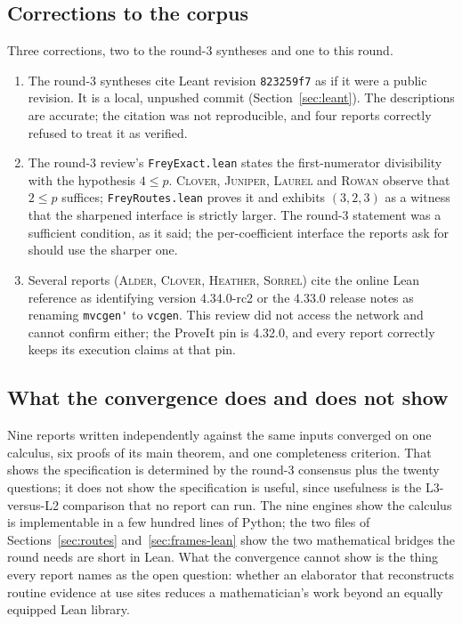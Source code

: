 \documentclass[11pt,a4paper]{article}
\newcommand{\code}[1]{\nolinkurl{#1}}
\newcommand{\Al}{\textsc{Alder}}
\newcommand{\Cl}{\textsc{Clover}}
\newcommand{\He}{\textsc{Heather}}
\newcommand{\Ju}{\textsc{Juniper}}
\newcommand{\La}{\textsc{Laurel}}
\newcommand{\Ro}{\textsc{Rowan}}
\newcommand{\So}{\textsc{Sorrel}}
\theoremstyle{definition}
\theoremstyle{plain}
\begin{document}
\subsection{Corrections to the corpus}\label{sec:corpus-correction}
Three corrections, two to the round-3 syntheses and one to this round.
\begin{enumerate}
\item The round-3 syntheses cite Leant revision \code{823259f7} as if it were a public revision. It is a local, unpushed commit (Section~\ref{sec:leant}). The descriptions are accurate; the citation was not reproducible, and four reports correctly refused to treat it as verified.
\item The round-3 review's \code{FreyExact.lean} states the first-numerator divisibility with the hypothesis $4\le p$. \Cl, \Ju, \La{} and \Ro{} observe that $2\le p$ suffices; \code{FreyRoutes.lean} proves it and exhibits $(3,2,3)$ as a witness that the sharpened interface is strictly larger. The round-3 statement was a sufficient condition, as it said; the per-coefficient interface the reports ask for should use the sharper one.
\item Several reports (\Al, \Cl, \He, \So) cite the online Lean reference as identifying version 4.34.0-rc2 or the 4.33.0 release notes as renaming \code{mvcgen'} to \code{vcgen}. This review did not access the network and cannot confirm either; the ProveIt pin is 4.32.0, and every report correctly keeps its execution claims at that pin.
\end{enumerate}

\subsection{What the convergence does and does not show}
Nine reports written independently against the same inputs converged on one calculus, six proofs of its main theorem, and one completeness criterion. That shows the specification is determined by the round-3 consensus plus the twenty questions; it does not show the specification is useful, since usefulness is the L3-versus-L2 comparison that no report can run. The nine engines show the calculus is implementable in a few hundred lines of Python; the two files of Sections~\ref{sec:routes} and~\ref{sec:frames-lean} show the two mathematical bridges the round needs are short in Lean. What the convergence cannot show is the thing every report names as the open question: whether an elaborator that reconstructs routine evidence at use sites reduces a mathematician's work beyond an equally equipped Lean library.
\end{document}

